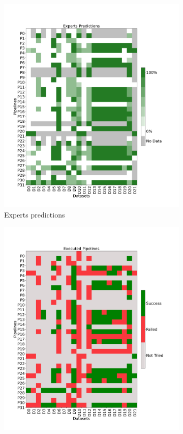 \begin{figure}
\centering
\begin{subfigure}{.60\textwidth}  \includegraphics[width=\columnwidth]{figures/Commented Success Percentage.pdf}
  \caption{Experts predictions}
  \label{fig:experts_matrix}
\end{subfigure} \hfill
\begin{subfigure}{.60\textwidth}
  \includegraphics[width=\columnwidth]{figures/Pipeline Execution Level 2.pdf}

\end{subfigure}
\end{figure}
